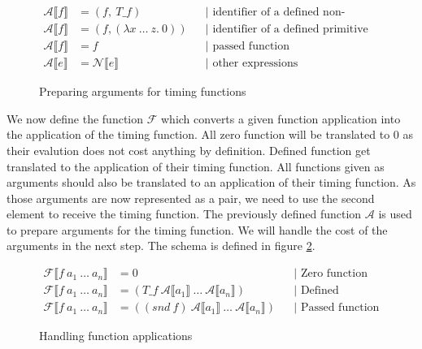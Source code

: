 \begin{figure}
  \begin{align*}
    \mathcal{A}\llbracket f\rrbracket &= (f,\ T\_f) &&\text{| identifier of a defined non-primitive function}\\
    \mathcal{A}\llbracket f\rrbracket &= (f, (\lambda x\ \dots\ z.\ 0)) &&\text{| identifier of a defined primitive function}\\
    \mathcal{A}\llbracket f\rrbracket &= f &&\text{| passed function}\\
    \mathcal{A}\llbracket e\rrbracket &= \mathcal{N}\llbracket e\rrbracket &&\text{| other expressions}
  \end{align*}
  \caption{Preparing arguments for timing functions}
  \label{fig:schema_A}
\end{figure}

We now define the function $\mathcal{F}$ which converts a given function application into the application of the timing function.
All zero function will be translated to $0$ as their evalution does not cost anything by definition.
Defined function get translated to the application of their timing function.
All functions given as arguments should also be translated to an application of their timing function.
As those arguments are now represented as a pair, we need to use the second element to receive the timing function.
The previously defined function $\mathcal{A}$ is used to prepare arguments for the timing function.
We will handle the cost of the arguments in the next step.
The schema is defined in figure \ref{fig:schema_F}.
\begin{figure}
\begin{align*}
  \mathcal{F}\llbracket f\ a_{1}\ \dots\ a_{n}\rrbracket &= 0 &&\text{| Zero function}\\
  \mathcal{F}\llbracket f\ a_{1}\ \dots\ a_{n}\rrbracket &= (T\_f\ \mathcal{A}\llbracket a_{1}\rrbracket\ \dots\ \mathcal{A}\llbracket a_{n}\rrbracket) &&\text{| Defined function}\\
  \mathcal{F}\llbracket f\ a_{1}\ \dots\ a_{n}\rrbracket &= ((snd\ f)\ \mathcal{A}\llbracket a_{1}\rrbracket\ \dots\ \mathcal{A}\llbracket a_{n}\rrbracket) &&\text{| Passed function}
\end{align*}
\caption{Handling function applications}
\label{fig:schema_F}
\end{figure}

